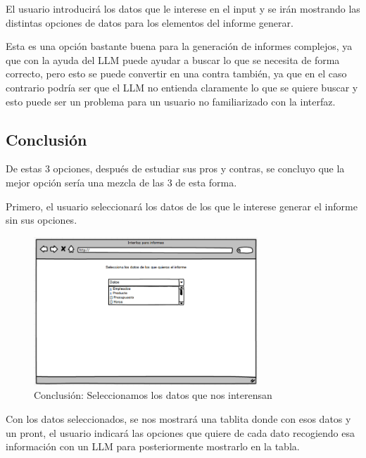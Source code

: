 El usuario introducirá los datos que le interese en el input y se irán mostrando las distintas opciones de datos 
para los elementos del informe generar.

Esta es una opción bastante buena para la generación de informes complejos, ya que con la ayuda del LLM puede ayudar a 
buscar lo que se necesita de forma correcto, pero esto se puede convertir en una contra también, ya que en el caso contrario 
podría ser que el LLM no entienda claramente lo que se quiere buscar y esto puede ser un problema para un usuario no familiarizado con la interfaz.

\subsection{Conclusión}

De estas 3 opciones, después de estudiar sus pros y contras, se concluyo que la mejor opción sería una mezcla de las 3 de esta forma.

Primero, el usuario seleccionará los datos de los que le interese generar el informe sin sus opciones.

\begin{figure}[hp!]
    \centering
    \includegraphics[width=0.75\textwidth]{imaxes/iteracion1.6.png}
    \caption{Conclusión: Seleccionamos los datos que nos interensan}
    \label{fig:iteracion1.6}
\end{figure}

Con los datos seleccionados, se nos mostrará una tablita donde con esos datos y un pront, 
el usuario indicará las opciones que quiere de cada dato recogiendo esa información con un LLM para posteriormente mostrarlo en la tabla.


